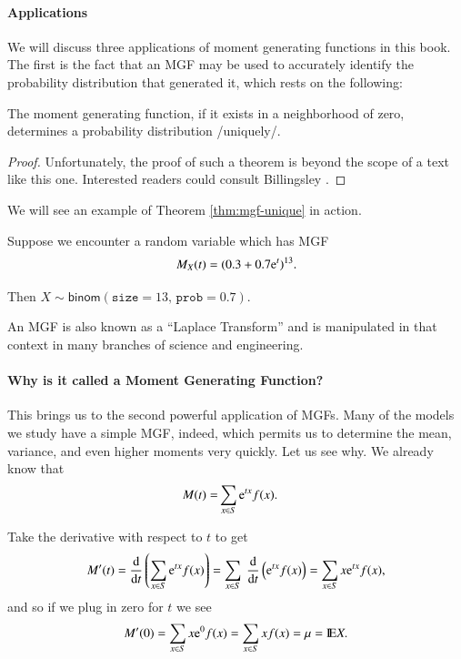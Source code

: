 \documentclass[captions=tableheading]{scrbook}
\begin{document}
\paragraph*{Applications}

We will discuss three applications of moment generating functions in this book. The first is the fact that an MGF may be used to accurately identify the probability distribution that generated it, which rests on the following:

\begin{thm}
\label{thm:mgf-unique}
The moment generating function, if it exists in a neighborhood of zero, determines a probability distribution /uniquely/. 
\end{thm}

\begin{proof}
Unfortunately, the proof of such a theorem is beyond the scope of a text like this one. Interested readers could consult Billingsley \cite{Billingsley1995}.
\end{proof}


We will see an example of Theorem \ref{thm:mgf-unique} in action.

\begin{example}
Suppose we encounter a random variable which has MGF
\[
M_{X}(t)=(0.3+0.7\mathrm{e}^{t})^{13}.
\]

Then \(X\sim\mathsf{binom}(\mathtt{size}=13,\,\mathtt{prob}=0.7)\).
\end{example}


An MGF is also known as a ``Laplace Transform'' and is manipulated in that context in many branches of science and engineering.

\paragraph*{Why is it called a Moment Generating Function?}

This brings us to the second powerful application of MGFs. Many of the models we study have a simple MGF, indeed, which permits us to determine the mean, variance, and even higher moments very quickly. Let us see why. We already know that 
\begin{alignat*}{1}
M(t)= & \sum_{x\in S}\mathrm{e}^{tx}f(x).
\end{alignat*}

Take the derivative with respect to \(t\) to get
\begin{equation}
M'(t)=\frac{\diff}{\diff t}\left(\sum_{x\in S}\me^{tx}f(x)\right)=\sum_{x\in S}\ \frac{\diff}{\diff t}\left(\me^{tx}f(x)\right)=\sum_{x\in S}x\me^{tx}f(x),
\end{equation}
and so if we plug in zero for \(t\) we see
\begin{equation}
M'(0)=\sum_{x\in S}x\mathrm{e}^{0}f(x)=\sum_{x\in S}xf(x)=\mu=\mathrm{I\hspace{-1.5pt}E} X.
\end{equation}
\end{document}
